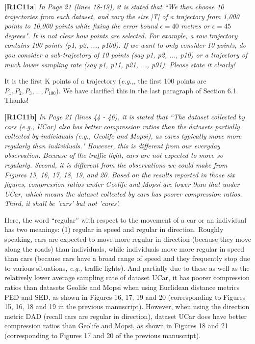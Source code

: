 \documentclass{letter}
\newcommand{\eg}{\emph{e.g.,}\xspace}
\begin{document}
\textbf{[R1C11a]} \emph{ In Page 21 (lines 18-19), it is stated that ``We then choose 10 trajectories from each dataset, and vary the size |T| of a trajectory from 1,000 points to 10,000 points while fixing the error bound $\epsilon = 40$ metres or $\epsilon = 45$ degrees". It is not clear how points are selected. For example, a raw trajectory contains 100 points (p1, p2, ..., p100). If we want to only consider 10 points, do you consider a sub-trajectory of 10 points (say p1, p2, ..., p10) or a trajectory of much lower sampling rate (say p1, p11, p21, ..., p91). Please state it clearly!}

It is the first K points of a trajectory (\eg, the first 100 points are $P_1, P_2, P_3, ..., P_{100}$). We have clarified this in the last paragraph of Section 6.1. Thanks!

\textbf{[R1C11b]} \emph{ In Page 21 (lines 44 - 46), it is stated that ``The dataset collected by cars (e.g., UCar) also has better compression ratios than the datasets partially collected by individuals (e.g., Geolife and Mopsi), as cares typically move more regularly than individuals." However, this is different from our everyday observation. Because of the traffic light, cars are not expected to move so regularly. Second, it is different from the observations we could make from Figures 15, 16, 17, 18, 19, and 20. Based on the results reported in those six figures, compression ratios under Geolife and Mopsi are lower than that under UCar, which means the dataset collected by cars has poorer compression ratios. Third, it shall be 'cars' but not 'cares'. }

Here, the word ``regular'' with respect to the movement of a car or an individual has two meanings: (1) regular in speed and regular in direction. Roughly speaking, cars are expected to move more regular in direction (because they move along the roads) than individuals, while individuals move more regular in speed than cars (because cars have a broad range of speed and they frequently stop due to various situations, \eg traffic lights).
And partially due to these as well as the relatively lower average sampling rate of dataset UCar, it has poorer compression ratios than datasets Geolife and Mopsi when using Euclidean distance metrics PED and SED, as shown in Figures 16, 17, 19 and 20 (corresponding to Figures 15, 16, 18 and 19 in the previous manuscript). However, when using the direction metric DAD (recall cars are regular in direction), dataset UCar does have better compression ratios than Geolife and Mopsi, as shown in Figures 18 and 21 (corresponding to Figures 17 and 20 of the previous manuscript).
\end{document}
